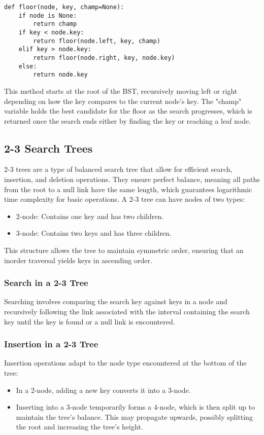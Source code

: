 \documentclass{article}
\begin{document}
\begin{verbatim}
def floor(node, key, champ=None):
    if node is None:
        return champ
    if key < node.key:
        return floor(node.left, key, champ)
    elif key > node.key:
        return floor(node.right, key, node.key)
    else:
        return node.key
\end{verbatim}

This method starts at the root of the BST, recursively moving left or right depending on how the key compares to the current node's key. The "champ" variable holds the best candidate for the floor as the search progresses, which is returned once the search ends either by finding the key or reaching a leaf node.

\subsection{2-3 Search Trees}

2-3 trees are a type of balanced search tree that allow for efficient search, insertion, and deletion operations. They ensure perfect balance, meaning all paths from the root to a null link have the same length, which guarantees logarithmic time complexity for basic operations. A 2-3 tree can have nodes of two types:

\begin{itemize}
    \item 2-node: Contains one key and has two children.
    \item 3-node: Contains two keys and has three children.
\end{itemize}

This structure allows the tree to maintain symmetric order, ensuring that an inorder traversal yields keys in ascending order.

\subsubsection{Search in a 2-3 Tree}
Searching involves comparing the search key against keys in a node and recursively following the link associated with the interval containing the search key until the key is found or a null link is encountered.

\subsubsection{Insertion in a 2-3 Tree}
Insertion operations adapt to the node type encountered at the bottom of the tree:
\begin{itemize}
    \item In a 2-node, adding a new key converts it into a 3-node.
    \item Inserting into a 3-node temporarily forms a 4-node, which is then split up to maintain the tree's balance. This may propagate upwards, possibly splitting the root and increasing the tree's height.
\end{itemize}
\end{document}
